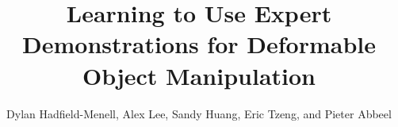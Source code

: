 \documentclass[conference]{IEEEtran}
\begin{document}
\title{Learning to Use Expert Demonstrations for Deformable Object Manipulation}

\author{Dylan Hadfield-Menell, Alex Lee, Sandy Huang, Eric Tzeng, and Pieter Abbeel}





% 


\maketitle
\end{document}
